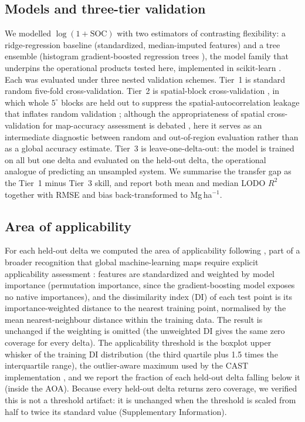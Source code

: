 \documentclass[11pt]{article}
\begin{document}
\subsection{Models and three-tier validation}
We modelled $\log(1+\mathrm{SOC})$ with two estimators of contrasting flexibility: a
ridge-regression baseline (standardized, median-imputed features) and a tree ensemble
(histogram gradient-boosted regression trees \citep{breiman2001,ke2017lightgbm}), the
model family that underpins the operational products tested here, implemented in
scikit-learn \citep{pedregosa2011}. Each was evaluated under three nested validation schemes. Tier~1
is standard random five-fold cross-validation. Tier~2 is spatial-block cross-validation
\citep{roberts2017}, in which whole $5^\circ$ blocks are held out to suppress the
spatial-autocorrelation leakage that inflates random validation \citep{ploton2020};
although the appropriateness of spatial cross-validation for map-accuracy assessment is
debated \citep{wadoux2021}, here it serves as an intermediate diagnostic between random
and out-of-region evaluation rather than as a global accuracy estimate. Tier~3 is
leave-one-delta-out: the model is trained on all but one delta and evaluated on the
held-out delta, the operational analogue of predicting an unsampled system. We summarise the transfer gap as the Tier~1 minus Tier~3 skill, and
report both mean and median LODO $R^2$ together with RMSE and bias back-transformed to
Mg\,ha$^{-1}$.

\subsection{Area of applicability}
For each held-out delta we computed the area of applicability following
\citet{meyer2021}, part of a broader recognition that global machine-learning maps
require explicit applicability assessment \citep{meyer2022}: features are standardized
and weighted by model importance (permutation importance, since the gradient-boosting
model exposes no native importances), and the dissimilarity index (DI) of each test point
is its importance-weighted distance to the nearest training point, normalised by the mean
nearest-neighbour distance within the training data. The result is unchanged if the
weighting is omitted (the unweighted DI gives the same zero coverage for every delta). The applicability threshold is the boxplot upper whisker of the training
DI distribution (the third quartile plus 1.5 times the interquartile range), the
outlier-aware maximum used by the CAST implementation \citep{meyer2021}, and we report
the fraction of each held-out delta falling below it (inside the AOA). Because every
held-out delta returns zero coverage, we verified this is not a threshold artifact: it
is unchanged when the threshold is scaled from half to twice its standard value
(Supplementary Information).
\end{document}
